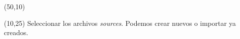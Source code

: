 \documentclass[aspectratio=169]{beamer}
\begin{document}
\begin{frame}[fragile,t]
    \begin{textblock}{75}(50,10)  \end{textblock}
    \begin{textblock}{38}(10,25) \small
     Seleccionar los archivos \emph{sources}. Podemos crear nuevos o importar ya creados.
    \end{textblock}
\end{frame}
\end{document}
